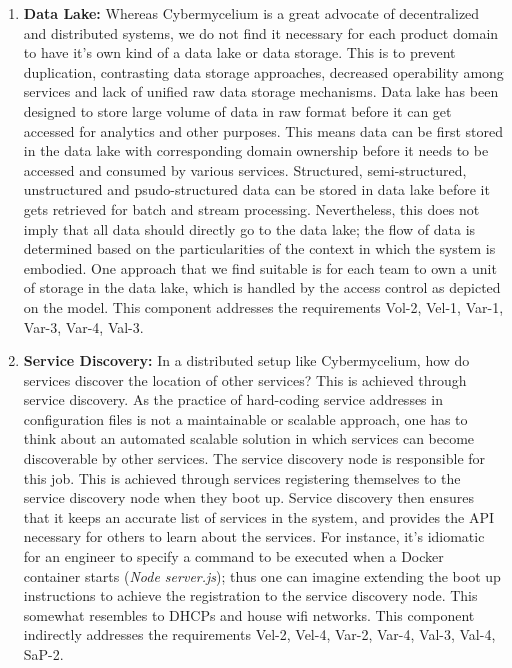 \documentclass[review]{elsarticle}
\begin{document}
\begin{enumerate}
    \item \textbf{Data Lake:} Whereas Cybermycelium is a great advocate of decentralized and distributed systems, we do not find it necessary for each product domain to have it's own kind of a data lake or data storage. This is to prevent duplication, contrasting data storage approaches, decreased operability among services and lack of unified raw data storage mechanisms. Data lake has been designed to store large volume of data in raw format before it can get accessed for analytics and other purposes. This means data can be first stored in the data lake with corresponding domain ownership before it needs to be accessed and consumed by various services. Structured, semi-structured, unstructured and psudo-structured data can be stored in data lake before it gets retrieved for batch and stream processing. Nevertheless, this does not imply that all data should directly go to the data lake; the flow of data is determined based on the particularities of the context in which the system is embodied. One approach that we find suitable is for each team to own a unit of storage in the data lake, which is handled by the access control as depicted on the model. This component addresses the requirements Vol-2, Vel-1, Var-1, Var-3, Var-4, Val-3.
    

    \item \textbf{Service Discovery:} In a distributed setup like Cybermycelium, how do services discover the location of other services? This is achieved through service discovery. As the practice of hard-coding service addresses in configuration files is not a maintainable or scalable approach, one has to think about an automated scalable solution in which services can become discoverable by other services. The service discovery node is responsible for this job. This is achieved through services registering themselves to the service discovery node when they boot up. Service discovery then ensures that it keeps an accurate list of services in the system, and provides the API necessary for others to learn about the services. For instance, it's idiomatic for an engineer to specify a command to be executed when a Docker container starts (\emph{Node server.js}); thus one can imagine extending the boot up instructions to achieve the registration to the service discovery node. This somewhat resembles to DHCPs and house wifi networks.  This component indirectly addresses the requirements Vel-2, Vel-4, Var-2, Var-4, Val-3, Val-4, SaP-2.


\end{enumerate}
\end{document}
